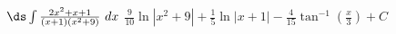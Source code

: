 {$\ds \int \frac{2x^2+x+1}{(x+1)(x^2+9)}\ dx$}
{$\frac{9}{10} \ln \left|x^2+9\right|+\frac{1}{5} \ln |x+1|-\frac{4}{15} \tan ^{-1}\left(\frac{x}{3}\right) +C$}

